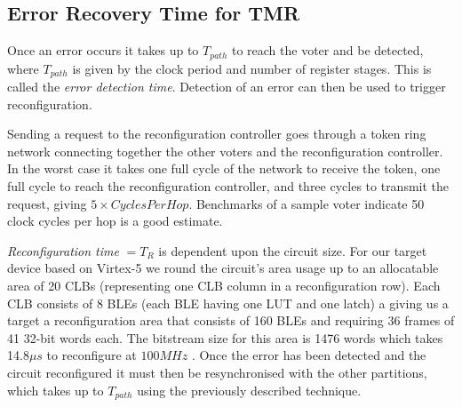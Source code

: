 \documentclass[12pt,final,oneside]{dwThesis} %
\begin{document}
   	\subsection{Error Recovery Time for \gls{TMR}}

   Once an error occurs it takes up to $T_{path}$ to reach the voter and be detected, where $T_{path}$ is given by the clock period and number of register stages. This is called the \textit{error detection time}. Detection of an error can then be used to trigger reconfiguration.
   
   Sending a request to the reconfiguration controller goes through a token ring network connecting together the other voters and the reconfiguration controller. In the worst case it takes one full cycle of the network to receive the token, one full cycle to reach the reconfiguration controller, and three cycles to transmit the request, giving $5\times Cycles Per Hop$. Benchmarks of a sample voter indicate 50 clock cycles per hop is a good estimate.

   \textit{Reconfiguration time} $= T_R$ is dependent upon the circuit size. For our target device based on Virtex-5 we round the circuit's area usage up to an allocatable area of 20 \glspl{CLB} (representing one \gls{CLB} column in a reconfiguration row). Each \gls{CLB} consists of 8 \glspl{BLE} (each \gls{BLE} having one \gls{LUT} and one latch) a giving us a target a reconfiguration area that consists of 160 \glspl{BLE} and requiring 36 frames of 41 32-bit words each. The bitstream size for this area is 1476 words which takes 14.8$\mu{}s$ to reconfigure at $100MHz$ \cite{XilinxConfigurationUG}.
   Once the error has been detected and the circuit reconfigured it must then be resynchronised with the other partitions, which takes up to $T_{path}$ using the previously described technique.
\end{document}

